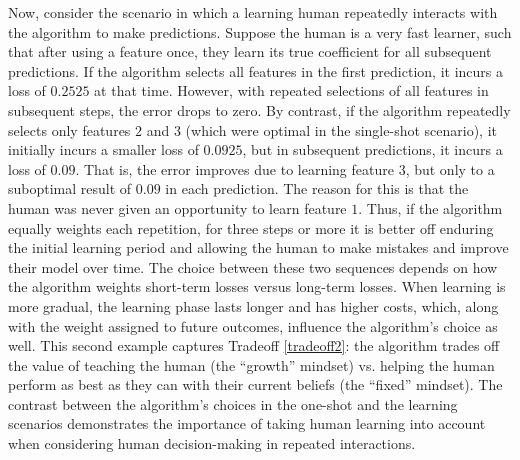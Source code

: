 Now, consider the scenario in which a learning human repeatedly interacts with the algorithm to make predictions. Suppose the human is a very fast learner, such that after using a feature once, they learn its true coefficient for all subsequent predictions. If the algorithm selects all features in the first prediction, it incurs a loss of $0.2525$ at that time. However, with repeated selections of all features in subsequent steps, the error drops to zero.
%
By contrast, if the algorithm repeatedly selects only features $2$ and $3$ (which were optimal in the single-shot scenario), it initially incurs a smaller loss of $0.0925$, but in subsequent predictions, it incurs a loss of $0.09$. That is, the error improves due to learning feature $3$, but only to a suboptimal result of $0.09$ in each prediction. The reason for this is that the human was never given an opportunity to learn feature $1$. Thus, if the algorithm equally weights each repetition, for three steps or more it is better off enduring the initial learning period and allowing the human to make mistakes and improve their {model} %
over time. 
The choice between these two sequences depends on how the algorithm weights short-term losses versus long-term losses. 
When learning is more gradual, the learning phase lasts longer and has higher costs, which, along with the weight assigned to future outcomes, influence the algorithm's choice as well.
This second example captures Tradeoff \ref{tradeoff2}: the algorithm trades off the value of teaching the human (the ``growth'' mindset) vs. helping the human perform as best as they can with their current beliefs (the ``fixed'' mindset). The contrast between the algorithm's choices in the one-shot and the learning scenarios demonstrates the importance of taking human learning into account {when considering human decision-making in repeated interactions. }



